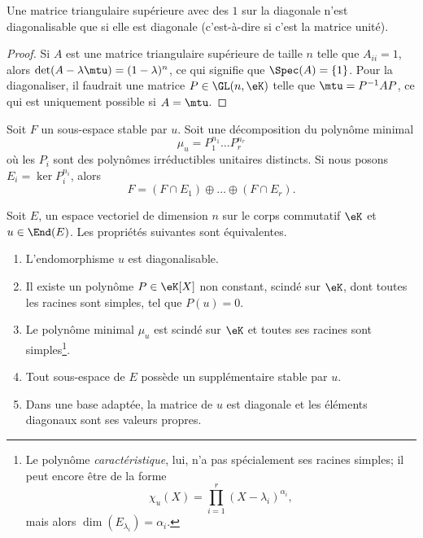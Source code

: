 \begin{lemma}
	Une matrice triangulaire supérieure avec des \( 1\) sur la diagonale n'est diagonalisable que si elle est diagonale (c'est-à-dire si c'est la matrice unité).
\end{lemma}

\begin{proof}
	Si \( A\) est une matrice triangulaire supérieure de taille \( n\) telle que \( A_{ii}=1\), alors \( \det(A-\lambda\mtu)=(1-\lambda)^n\), ce qui signifie que \( \Spec(A)=\{ 1 \}\). Pour la diagonaliser, il faudrait une matrice \( P\in\GL(n,\eK)\) telle que \( \mtu=P^{-1}AP\), ce qui est uniquement possible si \( A=\mtu\).
\end{proof}

\begin{lemma}       \label{LemgnaEOk}
	Soit \( F\) un sous-espace stable par \( u\). Soit une décomposition du polynôme minimal
	\begin{equation}
		\mu_u=P_1^{n_1}\ldots P_r^{n_r}
	\end{equation}
	où les \( P_i\) sont des polynômes irréductibles unitaires distincts. Si nous posons \( E_i=\ker P_i^{n_i}\), alors
	\begin{equation}
		F=(F\cap E_1)\oplus\ldots \oplus(F\cap E_r).
	\end{equation}
\end{lemma}

\begin{theorem}     \label{ThoDigLEQEXR}
	Soit \( E\), un espace vectoriel de dimension \( n\) sur le corps commutatif \( \eK\) et \( u\in\End(E)\). Les propriétés suivantes sont équivalentes.
	\begin{enumerate}
		\item       \label{ItemThoDigLEQEXRiv}
		      L'endomorphisme \( u\) est diagonalisable.
		\item       \label{ItemThoDigLEQEXRi}
		      Il existe un polynôme \( P\in\eK[X]\) non constant, scindé sur \(\eK\), dont toutes les racines sont simples, tel que \( P(u)=0\).
		\item       \label{ItemThoDigLEQEXRii}
		      Le polynôme minimal \( \mu_u\) est scindé sur \(\eK\) et toutes ses racines sont simples\footnote{Le polynôme \emph{caractéristique}, lui, n'a pas spécialement ses racines simples; il peut encore être de la forme
			      \begin{equation}
				      \chi_u(X)=\prod_{i=1}^r(X-\lambda_i)^{\alpha_i},
			      \end{equation}
			      mais alors \( \dim(E_{\lambda_i})=\alpha_i\). }.
		\item       \label{ItemThoDigLEQEXRiii}
		      Tout sous-espace de \( E\) possède un supplémentaire stable par \( u\).
		\item       \label{ITEMooZNJFooEiqDYp}
		      Dans une base adaptée, la matrice de \( u\) est diagonale et les éléments diagonaux sont ses valeurs propres.
	\end{enumerate}
\end{theorem}

